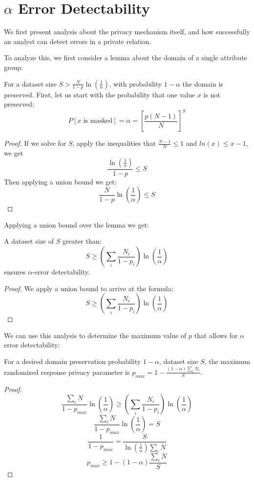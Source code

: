 \section{$\alpha$ Error Detectability}
We first present analysis about the privacy mechanism itself, and how successfully an analyst can detect errors in a private relation.



To analyze this, we first consider a lemma about the domain of a single attribute group:
\begin{lemma}
For a dataset size $S>\frac{N}{1-p}\ln(\frac{1}{\alpha})$, with probability
$1-\alpha$ the domain is preserved. First, let us start with the
probability that one value $x$ is not preserved:
\[
P[x\text{ is masked}]=\alpha=[\frac{p(N-1)}{N}]^{S}
\]
\end{lemma}
\begin{proof}
If we solve for $S$, apply the inequalities that $\frac{N-1}{N}\le1$
and $ln(x)\le x-1$, we get
\[
\frac{\ln(\frac{1}{\alpha})}{1-p}\le S
\]
Then applying a union bound we get:
\[
\frac{N}{1-p}\ln(\frac{1}{\alpha})\le S
\]
\end{proof}

Applying a union bound over the lemma we get:
\begin{theorem}
A dataset size of $S$ greater than:
\[
S\ge(\sum_{i}\frac{N_{i}}{1-p_{i}})\ln(\frac{1}{\alpha})
\]
ensures $\alpha$-error detectability.
\end{theorem}
\begin{proof}
We apply a union bound to arrive at the formula:
\[
S\ge(\sum_{i}\frac{N_{i}}{1-p_{i}})\ln(\frac{1}{\alpha})
\]
\end{proof}

We can use this analysis to determine the maximum value of $p$ that allows for $\alpha$ error detectability:
\begin{corollary}
For a desired domain preservation probability $1-\alpha$, dataset size $S$,
the maximum randomized response privacy parameter is $p_{max}=1-\frac{(1-\alpha)\sum_{i}N_{i}}{S}$.
\end{corollary}
\begin{proof}
\[
\frac{\sum_{i}N}{1-p_{max}}\ln(\frac{1}{\alpha})\ge(\sum_{i}\frac{N_{i}}{1-p_{i}})\ln(\frac{1}{\alpha})
\]
\[
\frac{\sum_{i}N}{1-p_{max}}\ln(\frac{1}{\alpha})=S
\]
\[
\frac{1}{1-p_{max}}=\frac{S}{\ln(\frac{1}{\alpha})\sum_{i}N}
\]
\[
p_{max}\ge1-(1-\alpha)\frac{\sum_{i}N}{S}
\]
\end{proof}
